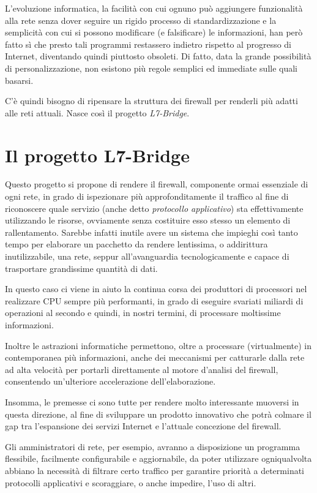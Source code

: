 L'evoluzione informatica, la facilità con cui ognuno può aggiungere funzionalità alla rete senza dover seguire un rigido processo di standardizzazione e la semplicità con cui si possono modificare (e falsificare) le informazioni, han però fatto sì che presto tali programmi restassero indietro rispetto al progresso di Internet, diventando quindi piuttosto obsoleti. Di fatto, data la grande possibilità di personalizzazione, non esistono più regole semplici ed immediate sulle quali basarsi.

C'è quindi bisogno di ripensare la struttura dei firewall per renderli più adatti alle reti attuali. Nasce così il progetto \emph{L7-Bridge}.

\section{Il progetto L7-Bridge}

Questo progetto si propone di rendere il firewall, componente ormai essenziale di ogni rete, in grado di ispezionare più approfonditamente il traffico al fine di riconoscere quale servizio (anche detto \emph{protocollo applicativo}) sta effettivamente utilizzando le risorse, ovviamente senza costituire esso stesso un elemento di rallentamento. Sarebbe infatti inutile avere un sistema che impieghi così tanto tempo per elaborare un pacchetto da rendere lentissima, o addirittura inutilizzabile, una rete, seppur all'avanguardia tecnologicamente e capace di trasportare grandissime quantità di dati.

In questo caso ci viene in aiuto la continua corsa dei produttori di processori nel realizzare CPU sempre più performanti, in grado di eseguire svariati miliardi di operazioni al secondo e quindi, in nostri termini, di processare moltissime informazioni.

Inoltre le astrazioni informatiche permettono, oltre a processare (virtualmente) in contemporanea più informazioni, anche dei meccanismi per catturarle dalla rete ad alta velocità per portarli direttamente al motore d'analisi del firewall, consentendo un'ulteriore accelerazione dell'elaborazione.

Insomma, le premesse ci sono tutte per rendere molto interessante muoversi in questa direzione, al fine di sviluppare un prodotto innovativo che potrà colmare il gap tra l'espansione dei servizi Internet e l'attuale concezione del firewall.

Gli amministratori di rete, per esempio, avranno a disposizione un programma flessibile, facilmente configurabile e aggiornabile, da poter utilizzare ogniqualvolta abbiano la necessità di filtrare certo traffico per garantire priorità a determinati protocolli applicativi e scoraggiare, o anche impedire, l'uso di altri.

